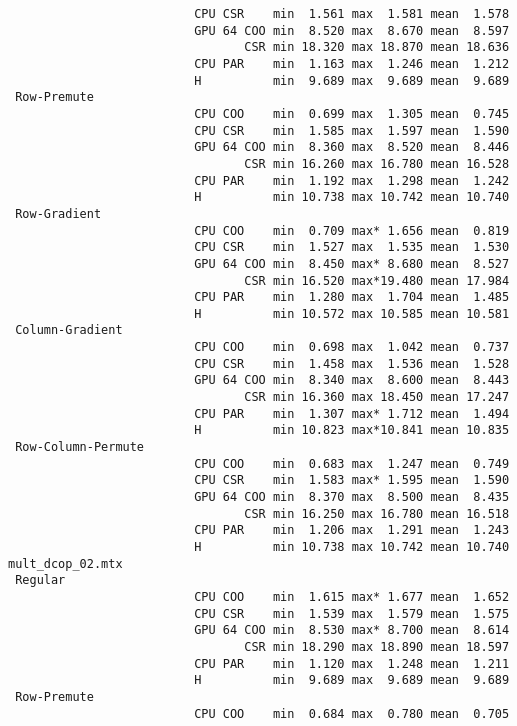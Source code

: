 \begin{verbatim}
                          CPU CSR    min  1.561 max  1.581 mean  1.578
                          GPU 64 COO min  8.520 max  8.670 mean  8.597
                                 CSR min 18.320 max 18.870 mean 18.636
                          CPU PAR    min  1.163 max  1.246 mean  1.212
                          H          min  9.689 max  9.689 mean  9.689
 Row-Premute
                          CPU COO    min  0.699 max  1.305 mean  0.745
                          CPU CSR    min  1.585 max  1.597 mean  1.590
                          GPU 64 COO min  8.360 max  8.520 mean  8.446
                                 CSR min 16.260 max 16.780 mean 16.528
                          CPU PAR    min  1.192 max  1.298 mean  1.242
                          H          min 10.738 max 10.742 mean 10.740
 Row-Gradient
                          CPU COO    min  0.709 max* 1.656 mean  0.819
                          CPU CSR    min  1.527 max  1.535 mean  1.530
                          GPU 64 COO min  8.450 max* 8.680 mean  8.527
                                 CSR min 16.520 max*19.480 mean 17.984
                          CPU PAR    min  1.280 max  1.704 mean  1.485
                          H          min 10.572 max 10.585 mean 10.581
 Column-Gradient
                          CPU COO    min  0.698 max  1.042 mean  0.737
                          CPU CSR    min  1.458 max  1.536 mean  1.528
                          GPU 64 COO min  8.340 max  8.600 mean  8.443
                                 CSR min 16.360 max 18.450 mean 17.247
                          CPU PAR    min  1.307 max* 1.712 mean  1.494
                          H          min 10.823 max*10.841 mean 10.835
 Row-Column-Permute
                          CPU COO    min  0.683 max  1.247 mean  0.749
                          CPU CSR    min  1.583 max* 1.595 mean  1.590
                          GPU 64 COO min  8.370 max  8.500 mean  8.435
                                 CSR min 16.250 max 16.780 mean 16.518
                          CPU PAR    min  1.206 max  1.291 mean  1.243
                          H          min 10.738 max 10.742 mean 10.740
mult_dcop_02.mtx
 Regular
                          CPU COO    min  1.615 max* 1.677 mean  1.652
                          CPU CSR    min  1.539 max  1.579 mean  1.575
                          GPU 64 COO min  8.530 max* 8.700 mean  8.614
                                 CSR min 18.290 max 18.890 mean 18.597
                          CPU PAR    min  1.120 max  1.248 mean  1.211
                          H          min  9.689 max  9.689 mean  9.689
 Row-Premute
                          CPU COO    min  0.684 max  0.780 mean  0.705

\end{verbatim}
